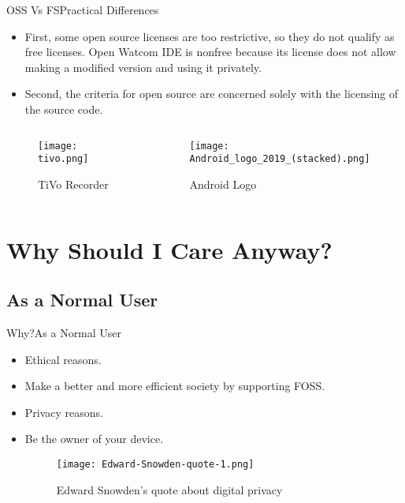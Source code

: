 \documentclass{beamer}
\begin{document}
    \begin{frame}{OSS Vs FS}{Practical Differences}
        \begin{itemize}
            \item First, some open source licenses are too restrictive, so they do not qualify as free licenses.
                Open Watcom IDE is nonfree because its license does not allow making a modified version and using it privately.\cite{GNUDOTORG:3}
            \item Second, the criteria for open source are concerned solely with the licensing of the source code.\cite{GNUDOTORG:3}
        \end{itemize}
        \begin{columns}
            \begin{column}{0.5\textwidth}
                \begin{figure}
                    \centering
                    \texttt{[image: tivo.png]}
                    \caption{TiVo Recorder\cite{tivoPhoto}}
                \end{figure}
            \end{column}
            \begin{column}{0.5\textwidth}
                \begin{figure}
                    \centering
                    \texttt{[image: Android\_logo\_2019\_(stacked).png]}
                    \caption{Android Logo\cite{androidPhoto}}
                \end{figure}
            \end{column}
        \end{columns}
    \end{frame}

    \section{Why Should I Care Anyway?}
        \subsection{As a Normal User}
    \begin{frame}{Why?}{As a Normal User}
       \begin{itemize}
           \item Ethical reasons.
           \item Make a better and more efficient society by supporting FOSS.
           \item Privacy reasons.
           \item Be the owner of your device.
            \begin{figure}
                \texttt{[image: Edward-Snowden-quote-1.png]}
                \caption{Edward Snowden's quote about digital privacy\cite{edward-snowden-quote}}
            \end{figure}
       \end{itemize}
    \end{frame}
\end{document}
